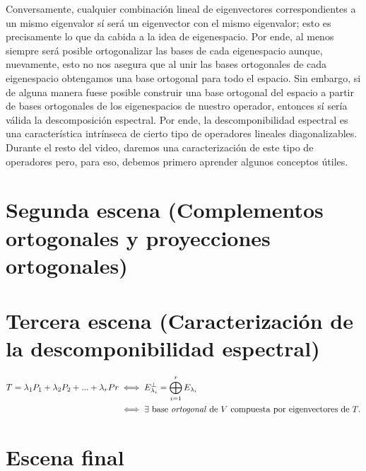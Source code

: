 \documentclass[12pt,dvipsnames]{article}
\begin{document}
Conversamente, cualquier combinación lineal de eigenvectores correspondientes a un mismo eigenvalor sí será un eigenvector con el mismo eigenvalor; esto es precisamente lo que da cabida a la idea de eigenespacio. Por ende, al menos siempre será posible ortogonalizar las bases de cada eigenespacio aunque, nuevamente, esto no nos asegura que al unir las bases ortogonales de cada eigenespacio obtengamos una base ortogonal para todo el espacio. Sin embargo, si de alguna manera fuese posible construir una base ortogonal del espacio a partir de bases ortogonales de los eigenespacios de nuestro operador, entonces sí sería válida la descomposición espectral. Por ende, la descomponibilidad espectral es una característica intrínseca de cierto tipo de operadores lineales diagonalizables. Durante el resto del video, daremos una caracterización de este tipo de operadores pero, para eso, debemos primero aprender algunos conceptos útiles.


\newpage
\section{Segunda escena (Complementos ortogonales y proyecciones ortogonales)}




\newpage
\section{Tercera escena (Caracterización de la descomponibilidad espectral)}

\begin{align*}
    T = \lambda_1P_1 + \lambda_2P_2 + ... + \lambda_rPr &\iff E_{\lambda_i}^\perp = \bigoplus_{i=1}^r E_{\lambda_i} \\
                                                        &\iff \exists \text{ base \emph{ortogonal} de } V \text{ compuesta por eigenvectores de } T.
\end{align*}


\newpage
\section{Escena final}
\end{document}
